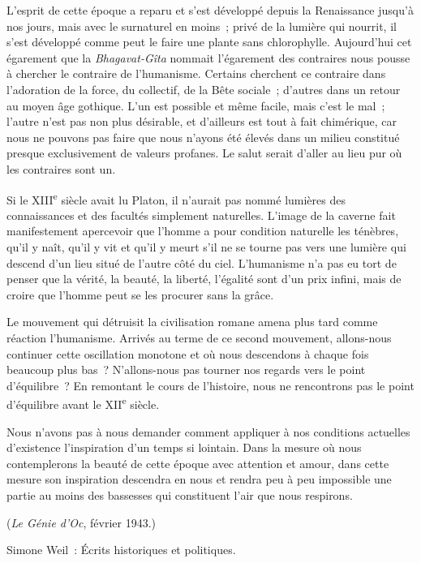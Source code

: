 \documentclass[french,twoside]{book} %
\begin{document}
\par
L'esprit de cette époque a reparu et s'est développé depuis la Renaissance jusqu'à nos jours, mais avec le surnaturel en moins ; privé de la lumière qui nourrit, il s'est développé comme peut le faire une plante sans chlorophylle. Aujourd'hui cet égarement que la {\itshape Bhagavat-Gîta} nommait l'égarement des contraires nous pousse à chercher le contraire de l'humanisme. Certains cher­chent ce contraire dans l'adoration de la force, du collectif, de la Bête sociale ; d'autres dans un retour au moyen âge gothique. L'un est possible et même facile, mais c'est le mal ; l'autre n'est pas non plus désirable, et d'ailleurs est tout à fait chimérique, car nous ne pouvons pas faire que nous n'ayons été élevés dans un milieu constitué presque exclusivement de valeurs profanes. Le salut serait d'aller au lieu pur où les contraires sont un.\par
Si le XIII\textsuperscript{e} siècle avait lu Platon, il n'aurait pas nommé lumières des connaissances et des facultés simplement naturelles. L'image de la caverne fait manifestement apercevoir que l'homme a pour condition naturelle les ténèbres, qu'il y naît, qu'il y vit et qu'il y meurt s'il ne se tourne pas vers une lumière qui descend d'un lieu situé de l'autre côté du ciel. L'humanisme n'a pas eu tort de penser que la vérité, la beauté, la liberté, l'égalité sont d'un prix infini, mais de croire que l'homme peut se les procurer sans la grâce.\par
Le mouvement qui détruisit la civilisation romane amena plus tard comme réaction l'humanisme. Arrivés au terme de ce second mouvement, allons-nous continuer cette oscillation monotone et où nous descendons à chaque fois beaucoup plus bas ? N'allons-nous pas tourner nos regards vers le point d'équilibre ? En remontant le cours de l'histoire, nous ne rencontrons pas le point d'équilibre avant le XII\textsuperscript{e} siècle.\par
Nous n'avons pas à nous demander comment appliquer à nos conditions actuelles d'existence l'inspiration d'un temps si lointain. Dans la mesure où nous contemplerons la beauté de cette époque avec attention et amour, dans cette mesure son inspiration descendra en nous et rendra peu à peu impossible une partie au moins des bassesses qui constituent l'air que nous respirons.\par
({\itshape Le Génie d'Oc}, février 1943.)\par

\begin{center}
Simone Weil : Écrits historiques et politiques.\end{center}
\end{document}
